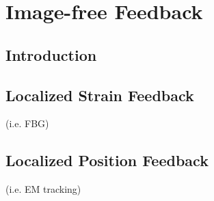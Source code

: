 \chapter{Image-free Feedback} \label{chap:chap-4}

\section{Introduction}
\label{sec:chap_4_introduction}

\section{Localized Strain Feedback}
\label{sec:localized_strain_feedback}

(i.e. FBG)

\section{Localized Position Feedback}
\label{sec:localized_position_feedback}

(i.e. EM tracking)

